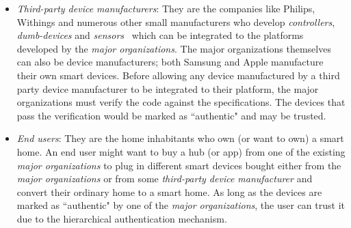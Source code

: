 \documentclass{article}
\begin{document}
\begin{itemize}[topsep=0pt,itemsep=0ex,partopsep=1ex,parsep=1ex]
\item \textit{Third-party device manufacturers}: They are the companies like Philips, Withings and numerous other small manufacturers who develop \textit{controllers}, \textit{dumb-devices} and \textit{sensors}~\cite{workswithsmartthings, workswithhomekit} which can be integrated to the platforms developed by the \textit{major organizations}. The major organizations themselves can also be device manufacturers; both Samsung and Apple manufacture their own smart devices. Before  allowing any device manufactured by a third party device manufacturer to be integrated to their platform, the major organizations must verify the code against the specifications. The devices that pass the verification would be marked as ``authentic" and may be trusted. 

\item \textit{End users}: They are the home inhabitants who own (or want to own) a smart home. An end user might want to buy a hub (or app) from one of the existing \textit{major organizations} to plug in different smart devices bought either from the \textit{major organizations} or from some \textit{third-party device manufacturer} and convert their ordinary home to a smart home. As long as the devices are marked as ``authentic" by one of the \textit{major organizations}, the user can trust it due to the hierarchical authentication mechanism.
\end{itemize}



\end{document}
